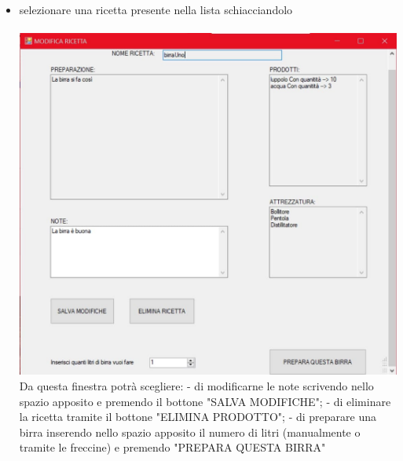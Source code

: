 \documentclass[a4paper, titlepage]{article}
\begin{document}
\begin{itemize}
    \newpage
    \item selezionare una ricetta presente nella lista schiacciandolo\\\\
    \includegraphics[scale=0.30]{Immagini/form/Form Ricetta.jpg}
    \\Da questa finestra potrà scegliere:
        \subitem - di modificarne le note scrivendo nello spazio apposito e premendo il bottone "SALVA MODIFICHE";
        \subitem - di eliminare la ricetta tramite il bottone "ELIMINA PRODOTTO";
        \subitem - di preparare una birra inserendo nello spazio apposito il numero di litri (manualmente o tramite le freccine) e premendo "PREPARA QUESTA BIRRA"
\end{itemize}
\end{document}
